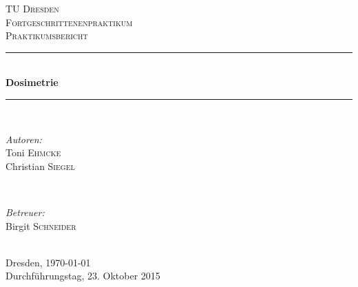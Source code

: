 \begin{titlepage}
\newcommand{\HRule}{\rule{\linewidth}{0.5mm}} %

\center %
 

\textsc{\LARGE TU Dresden}\\[1.5cm] %
\textsc{\Large Fortgeschrittenenpraktikum}\\[0.5cm] %
\textsc{\Large Praktikumsbericht}\\[0.5cm] %


\HRule \\[0.7cm]
{ \huge \bfseries Dosimetrie}\\[0.4cm] %
\HRule \\[1.5cm]
 

\begin{minipage}{0.4\textwidth}
\begin{flushleft} \large
\emph{Autoren:}\\
Toni \textsc{Ehmcke}\\
Christian \textsc{Siegel}
\end{flushleft}
\end{minipage}
~
\begin{minipage}{0.4\textwidth}
\begin{flushright} \large
\emph{Betreuer:} \\
Birgit \textsc{Schneider} %
\end{flushright}
\end{minipage}\\[4cm]


{\large Dresden, \today}\\
\vspace{5mm}
{\large Durchführungstag, 23. Oktober 2015}\\

\vfill 

\end{titlepage}
